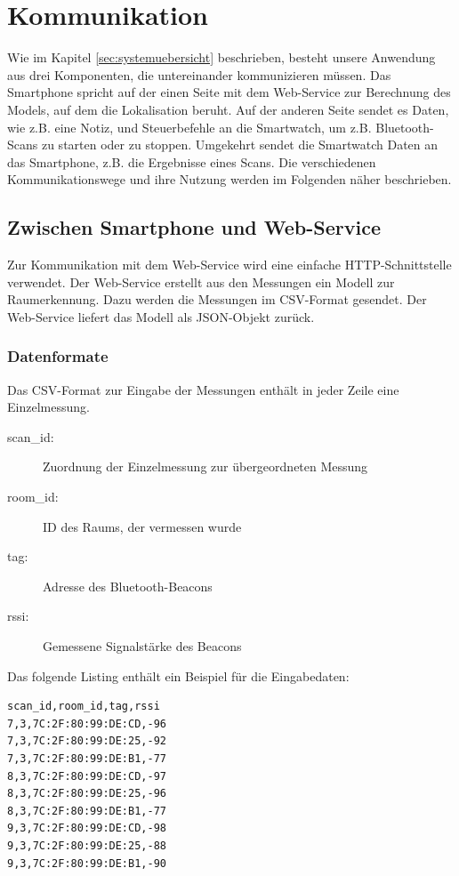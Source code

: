 \section{Kommunikation}
Wie im Kapitel \ref{sec:systemuebersicht} beschrieben, besteht unsere Anwendung aus drei Komponenten, die untereinander kommunizieren müssen. Das Smartphone spricht auf der einen Seite mit dem Web-Service zur Berechnung des Models, auf dem die Lokalisation beruht. Auf der anderen Seite sendet es Daten, wie z.B. eine Notiz, und Steuerbefehle an die Smartwatch, um z.B. Bluetooth-Scans zu starten oder zu stoppen. Umgekehrt sendet die Smartwatch Daten an das Smartphone, z.B. die Ergebnisse eines Scans. Die verschiedenen Kommunikationswege und ihre Nutzung werden im Folgenden näher beschrieben.

\subsection{Zwischen Smartphone und Web-Service}

Zur Kommunikation mit dem Web-Service wird eine einfache HTTP-Schnittstelle verwendet.
Der Web-Service erstellt aus den Messungen ein Modell zur Raumerkennung. Dazu
werden die Messungen im CSV-Format gesendet. Der Web-Service liefert das Modell
als JSON-Objekt zurück.

\subsubsection{Datenformate}

Das CSV-Format zur Eingabe der Messungen enthält in jeder Zeile eine Einzelmessung.
\begin{description}
	\item[scan\_id:] Zuordnung der Einzelmessung zur übergeordneten Messung
	\item[room\_id:] ID des Raums, der vermessen wurde
	\item[tag:] Adresse des Bluetooth-Beacons
	\item[rssi:] Gemessene Signalstärke des Beacons
\end{description}

Das folgende Listing enthält ein Beispiel für die Eingabedaten:
\begin{lstlisting}
scan_id,room_id,tag,rssi
7,3,7C:2F:80:99:DE:CD,-96
7,3,7C:2F:80:99:DE:25,-92
7,3,7C:2F:80:99:DE:B1,-77
8,3,7C:2F:80:99:DE:CD,-97
8,3,7C:2F:80:99:DE:25,-96
8,3,7C:2F:80:99:DE:B1,-77
9,3,7C:2F:80:99:DE:CD,-98
9,3,7C:2F:80:99:DE:25,-88
9,3,7C:2F:80:99:DE:B1,-90
\end{lstlisting}

